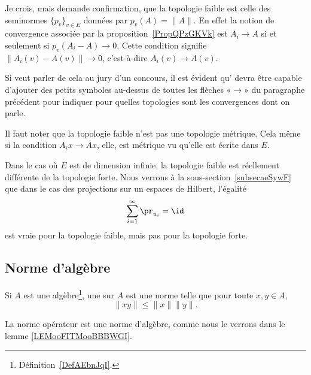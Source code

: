 \begin{probleme}
    Je crois, mais demande confirmation, que la topologie faible est celle des seminormes \( \{ p_v \}_{v\in E}\) données par \( p_v(A)=\| A \|\). En effet la notion de convergence associée par la proposition~\ref{PropQPzGKVk} est \( A_i\to A\) si et seulement si \( p_v(A_i-A)\to 0\). Cette condition signifie \( \| A_i(v)-A(v) \|\to 0\), c'est-à-dire \( A_i(v)\to A(v)\).

    Si  veut parler de cela au jury d'un concours, il est évident qu' devra être capable d'ajouter des petits symboles au-dessus de toutes les flèches «\( \to\)» du paragraphe précédent pour indiquer pour quelles topologies sont les convergences dont on parle.
\end{probleme}

\begin{remark}
    Il faut noter que la topologie faible n'est pas une topologie métrique. Cela même si la condition \( A_ix\to Ax\), elle, est métrique vu qu'elle est écrite dans \( E\).

    Dans le cas où \( E\) est de dimension infinie, la topologie faible est réellement différente de la topologie forte. Nous verrons à la sous-section~\ref{subsecaeSywF} que dans le cas des projections sur un espaces de Hilbert, l'égalité
    \begin{equation}
        \sum_{i=1}^{\infty}\pr_{u_i}=\id
    \end{equation}
    est vraie pour la topologie faible, mais pas pour la topologie forte.
\end{remark}

\subsection{Norme d'algèbre}

\begin{definition}  \label{DefJWRWQue}
    Si \( A\) est une algèbre\footnote{Définition~\ref{DefAEbnJqI}.}, une  sur \( A\) est une norme telle que pour toute \( x,y\in A\),
    \begin{equation}
        \| xy \|\leq \| x \|\| y \|.
    \end{equation}
\end{definition}
La norme opérateur est une norme d'algèbre, comme nous le verrons dans le lemme \ref{LEMooFITMooBBBWGI}.


